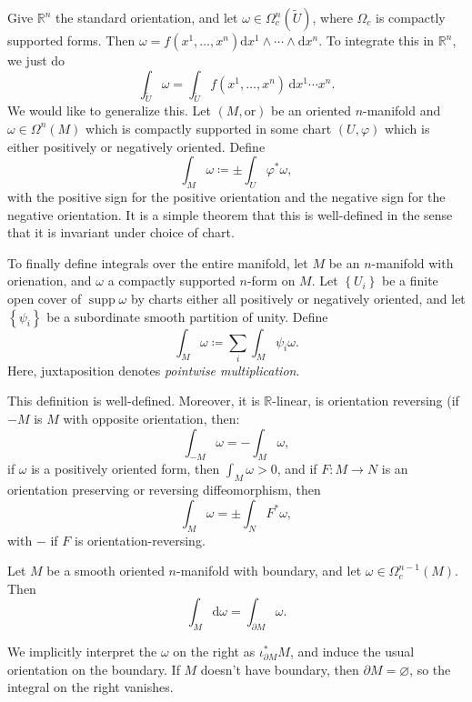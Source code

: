 
Give $\mathbb{R} ^n$ the standard orientation, and let $\omega \in \Omega ^n_c(\widetilde{U} )$, where $\Omega _c$ is compactly supported forms. Then $\omega =f(x^1, \ldots ,x^n)\mathrm{d} x^1 \wedge \cdots \wedge \mathrm{d} x^n$. To integrate this in $\mathbb{R} ^n$, we just do
\[
	\int_{\widetilde{U} } \omega=\int_{\widetilde{U} } f(x^1, \ldots ,x^n) \,\mathrm{d} x^1 \cdots x^n
.\]
We would like to generalize this. Let $(M,\mathrm{or} )$ be an oriented $n$-manifold and $\omega \in \Omega ^n(M)$ which is compactly supported in some chart $(U,\varphi )$ which is either positively or negatively oriented. Define
\[
	\int_M \omega \coloneqq \pm \int_{U} \varphi ^*\omega ,
\]
with the positive sign for the positive orientation and the negative sign for the negative orientation. It is a simple theorem that this is well-defined in the sense that it is invariant under choice of chart.

To finally define integrals over the entire manifold, let $M$ be an $n$-manifold with orienation, and $\omega $ a compactly supported $n$-form on $M$. Let $\left\{ U_i \right\} $ be a finite open cover of $\operatorname{supp} \omega $ by charts either all positively or negatively oriented, and let $\left\{ \psi _i \right\} $ be a subordinate smooth partition of unity. Define
\[
	\int_M \omega \coloneqq \sum_{i} \int_M \psi _i\omega 
.\]
Here, juxtaposition denotes \emph{pointwise multiplication}.
\begin{proposition}\label{owo}
	This definition is well-defined. Moreover, it is $\mathbb{R} $-linear, is orientation reversing (if $-M$ is $M$ with opposite orientation, then:
	\[
		\int _{-M} \omega =-\int _M\omega  ,
	\]
	if $\omega $ is a positively oriented form, then $\int _M\omega >0$, and if $F : M \to N$ is an orientation preserving or reversing diffeomorphism, then
	\[
		\int_M\omega =\pm\int_NF^*\omega ,
	\]
	with $-$ if $F$ is orientation-reversing.
\end{proposition}
\begin{theorem}[Stokes]\label{the end}
	Let $M$ be a smooth oriented $n$-manifold with boundary, and let $\omega\in \Omega _c^{n-1} (M)$. Then
	\[
		\int_M \mathrm{d}\omega  = \int_{\partial M}\omega 
	.\]
\end{theorem}
\begin{remark}
	We implicitly interpret the $\omega $ on the right as $\iota _{\partial M} ^*M$, and induce the usual orientation on the boundary. If $M$ doesn't have boundary, then $\partial M=\varnothing $, so the integral on the right vanishes.
\end{remark}


